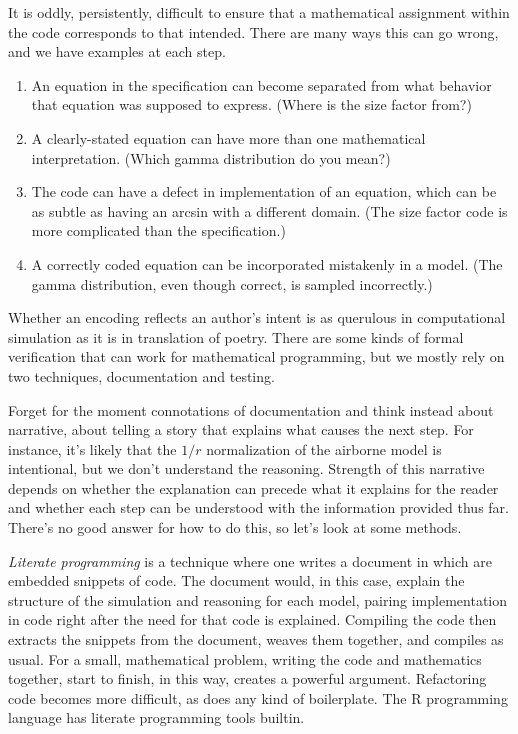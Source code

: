 \documentclass{article}
\begin{document}
It is oddly, persistently, difficult to ensure that
a mathematical assignment within the code corresponds to
that intended. There are many ways this can go wrong, and we
have examples at each step.
\begin{enumerate}
    \item An equation in the specification can become separated
          from what behavior that equation was supposed to express.
          (Where is the size factor from?)
    \item A clearly-stated equation can have more than one
          mathematical interpretation. (Which gamma distribution do you mean?)
    \item The code can have a defect in implementation of an equation,
          which can be as subtle as having an arcsin with a different
          domain.
          (The size factor code is more complicated than the specification.)
    \item A correctly coded equation can be incorporated mistakenly
          in a model. (The gamma distribution, even though correct, is sampled incorrectly.)
\end{enumerate}
Whether an encoding reflects an author's intent is as querulous
in computational simulation as it is in translation of poetry.
There are some kinds of formal verification that can work
for mathematical programming, but we mostly rely on two
techniques, documentation and testing.

Forget for the moment connotations of documentation and think
instead about narrative, about telling a story that explains
what causes the next step. For instance, it's likely that the
$1/r$ normalization of the airborne model is intentional, but
we don't understand the reasoning. Strength of this narrative
depends on whether the explanation can precede what it explains
for the reader and whether each step can be understood with
the information provided thus far.
There's no good answer for how to do this, so let's look at
some methods.

\emph{Literate programming\/} is a technique where one writes
a document in which are embedded snippets of code. The document
would, in this case, explain the structure of the simulation
and reasoning for each model, pairing implementation in code
right after the need for that code is explained.
Compiling the code then extracts the snippets from the document,
weaves them together, and compiles as usual.
For a small, mathematical problem, writing the code and mathematics
together, start to finish, in this way, creates a powerful
argument. Refactoring code becomes more difficult, as
does any kind of boilerplate. The R programming language
has literate programming tools builtin.
\end{document}
